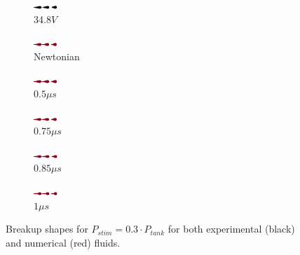 \documentclass[twocolumn,10pt]{asme2ej}
\begin{document}
\begin{figure}[]

    \begin{subfigure}[t]{1.2cm}
        \centering
        \includegraphics[angle=-90,origin=c,width=0.9cm]{Encre/exp_A3.png}        
        \caption{34.8$V$}
    \end{subfigure}
    \hfill
    \begin{subfigure}[t]{1.2cm}
        \centering
        \includegraphics[angle=-90,origin=c,width=0.9cm]{Encre/0_A3.png}

        \caption{Newtonian}
    \end{subfigure}
    \hfill
    \begin{subfigure}[t]{1.2cm}
        \centering
        \includegraphics[angle=-90,origin=c,width=0.9cm]{Encre/05_A3.png}
        \caption{$0.5\mu s$}
    \end{subfigure}\hfill
    \begin{subfigure}[t]{1.2cm}
        \centering
        \includegraphics[angle=-90,origin=c,width=0.9cm]{Encre/075_A3.png}
        \caption{$0.75\mu s$}
    \end{subfigure}
    \hfill
    \begin{subfigure}[t]{1.2cm}
        \centering
        \includegraphics[angle=-90,origin=c,width=0.9cm]{Encre/085_A3.png}
        \caption{$0.85\mu s$}
    \end{subfigure}
    \hfill
    \begin{subfigure}[t]{1.2cm}
        \centering
        \includegraphics[angle=-90,origin=c,width=0.9cm]{Encre/1_A3.png}
        \caption{$1\mu s$}
    \end{subfigure}
       \caption{Breakup shapes for $P_{stim}=0.3\cdot P_{tank}$ for both experimental (black) and numerical (red) fluids.}
       \label{fig:A3}
\end{figure}
\end{document}

